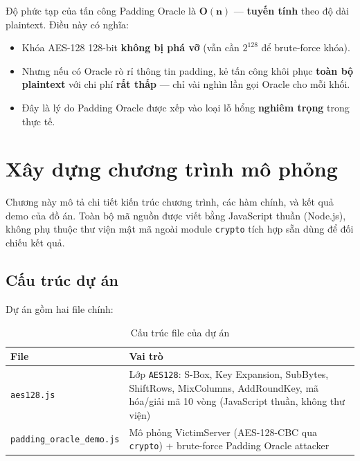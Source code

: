 \begin{tcolorbox}[title=Điểm quan trọng, colback=red!5!white, colframe=red!75!black]
Độ phức tạp của tấn công Padding Oracle là $\mathbf{O(n)}$ --- \textbf{tuyến tính} theo độ dài plaintext. Điều này có nghĩa:
\begin{itemize}
    \item Khóa AES-128 128-bit \textbf{không bị phá vỡ} (vẫn cần $2^{128}$ để brute-force khóa).
    \item Nhưng nếu có Oracle rò rỉ thông tin padding, kẻ tấn công khôi phục \textbf{toàn bộ plaintext} với chi phí \textbf{rất thấp} --- chỉ vài nghìn lần gọi Oracle cho mỗi khối.
    \item Đây là lý do Padding Oracle được xếp vào loại lỗ hổng \textbf{nghiêm trọng} trong thực tế.
\end{itemize}
\end{tcolorbox}

\chapter{Xây dựng chương trình mô phỏng}
\label{chap:implementation}

Chương này mô tả chi tiết kiến trúc chương trình, các hàm chính, và kết quả demo của đồ án. Toàn bộ mã nguồn được viết bằng JavaScript thuần (Node.js), không phụ thuộc thư viện mật mã ngoài module \texttt{crypto} tích hợp sẵn dùng để đối chiếu kết quả.

\section{Cấu trúc dự án}
\label{sec:structure}

Dự án gồm hai file chính:

\begin{table}[htbp]
\centering
\caption{Cấu trúc file của dự án}
\label{tab:files}
\begin{tabular}{@{}p{5cm}p{9cm}@{}}
\toprule
\textbf{File} & \textbf{Vai trò} \\
\midrule
\texttt{aes128.js} & Lớp \texttt{AES128}: S-Box, Key Expansion, SubBytes, ShiftRows, MixColumns, AddRoundKey, mã hóa/giải mã 10 vòng (JavaScript thuần, không thư viện) \\
\texttt{padding\_oracle\_demo.js} & Mô phỏng VictimServer (AES-128-CBC qua \texttt{crypto}) + brute-force Padding Oracle attacker \\
\bottomrule
\end{tabular}
\end{table}

